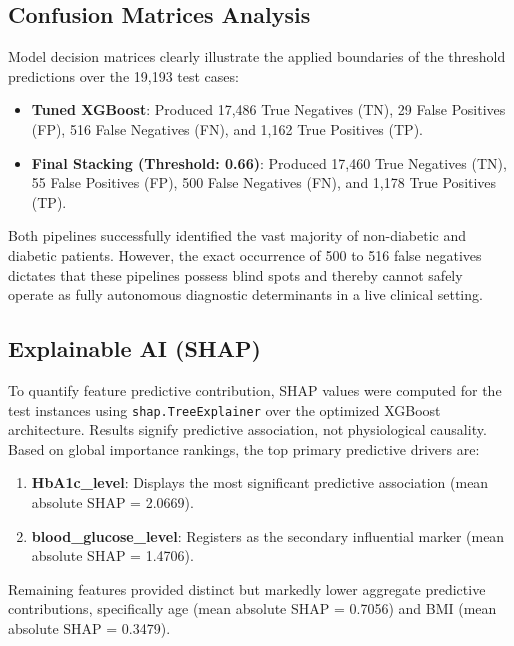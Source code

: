 \documentclass[conference]{IEEEtran}
\begin{document}
\subsection{Confusion Matrices Analysis}
Model decision matrices clearly illustrate the applied boundaries of the threshold predictions over the 19,193 test cases:
\begin{itemize}
\item \textbf{Tuned XGBoost}: Produced 17,486 True Negatives (TN), 29 False Positives (FP), 516 False Negatives (FN), and 1,162 True Positives (TP).
\item \textbf{Final Stacking (Threshold: 0.66)}: Produced 17,460 True Negatives (TN), 55 False Positives (FP), 500 False Negatives (FN), and 1,178 True Positives (TP).
\end{itemize}


Both pipelines successfully identified the vast majority of non-diabetic and diabetic patients. However, the exact occurrence of 500 to 516 false negatives dictates that these pipelines possess blind spots and thereby cannot safely operate as fully autonomous diagnostic determinants in a live clinical setting.


\subsection{Explainable AI (SHAP)}
To quantify feature predictive contribution, SHAP values were computed for the test instances using \texttt{shap.TreeExplainer} over the optimized XGBoost architecture. Results signify predictive association, not physiological causality. Based on global importance rankings, the top primary predictive drivers are:
\begin{enumerate}
\item \textbf{HbA1c\_level}: Displays the most significant predictive association (mean absolute SHAP = 2.0669).
\item \textbf{blood\_glucose\_level}: Registers as the secondary influential marker (mean absolute SHAP = 1.4706).
\end{enumerate}

Remaining features provided distinct but markedly lower aggregate predictive contributions, specifically age (mean absolute SHAP = 0.7056) and BMI (mean absolute SHAP = 0.3479).
\end{document}
